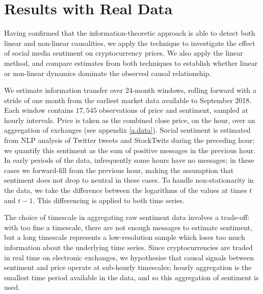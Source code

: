 \documentclass[]{rsos}%
\begin{document}


\section{Results with Real Data} \label{s.results}
  Having confirmed that the information-theoretic approach is able to detect both linear and non-linear causalities, we apply the technique to investigate the effect of social media sentiment on cryptocurrency prices. We also apply the linear method, and compare estimates from both techniques to establish whether linear or non-linear dynamics dominate the observed causal relationship.

  We estimate information transfer over 24-month windows, rolling forward with a stride of one month from the earliest market data available to September 2018. Each window contains $17,545$ observations of price and sentiment, sampled at hourly intervals. Price is taken as the combined close price, on the hour, over an aggregation of exchanges (see appendix \ref{a.data}). Social sentiment is estimated from NLP analysis of Twitter tweets and StockTwits during the preceding hour; we quantify this sentiment as the sum of positive messages in the previous hour. In early periods of the data, infrequently some hours have no messages; in these cases we forward-fill from the previous hour, making the assumption that sentiment does not drop to neutral in these cases. To handle non-stationarity in the data, we take the difference between the logarithms of the values at times $t$ and $t-1$. This differencing is applied to both time series. 

  The choice of timescale in aggregating raw sentiment data involves a trade-off: with too fine a timescale, there are not enough messages to estimate sentiment, but a long timescale represents a low-resolution sample which loses too much information about the underlying time series. Since cryptocurrencies are traded in real time on electronic exchanges, we hypothesise that causal signals between sentiment and price operate at sub-hourly timescales; hourly aggregation is the smallest time period available in the data, and so this aggregation of sentiment is used. 
\end{document}
